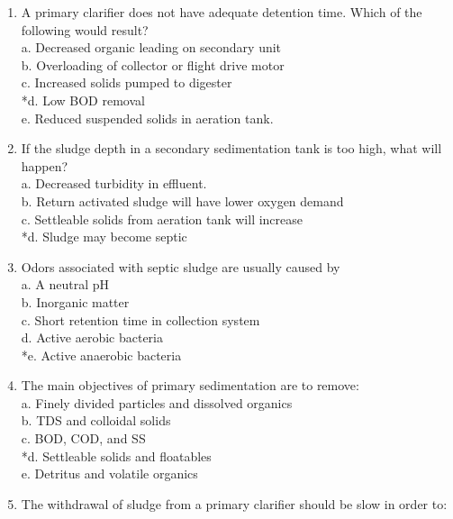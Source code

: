 \begin{enumerate}
\item  A primary clarifier does not have adequate detention time. Which of the following would result? \\

a. Decreased organic leading on secondary unit \\
b. Overloading of collector or flight drive motor \\
c. Increased solids pumped to digester \\
*d. Low BOD removal \\
e. Reduced suspended solids in aeration tank. \\


\item  If the sludge depth in a secondary sedimentation tank is too high, what will happen? \\

a. Decreased turbidity in effluent. \\
b. Return activated sludge will have lower oxygen demand \\
c. Settleable solids from aeration tank will increase \\
*d. Sludge may become septic \\


\item  Odors associated with septic sludge are usually caused by \\

a. A neutral pH \\
b. Inorganic matter \\
c. Short retention time in collection system \\
d. Active aerobic bacteria \\
*e. Active anaerobic bacteria \\


\item  The main objectives of primary sedimentation are to remove: \\

a. Finely divided particles and dissolved organics \\
b. TDS and colloidal solids \\
c. BOD, COD, and SS \\
*d. Settleable solids and floatables \\
e. Detritus and volatile organics \\


\item  The withdrawal of sludge from a primary clarifier should be slow in order to: \\


\end{enumerate}
